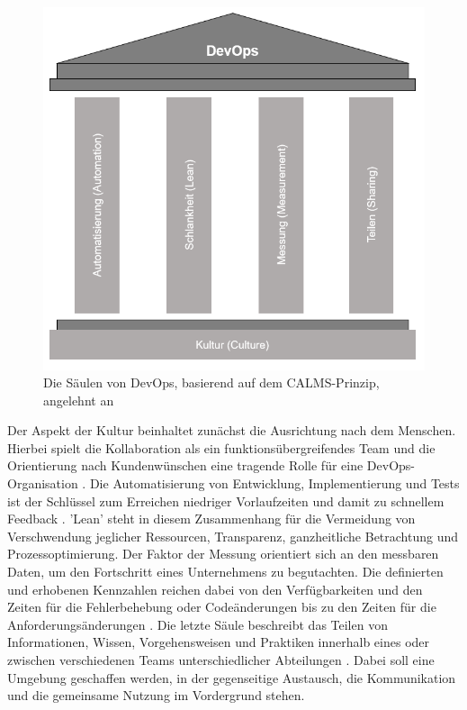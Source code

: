 \begin{figure}[h]
     \centering
     \includegraphics[scale=0.4]{Bilder/Calms.png}
     \caption{Die Säulen von DevOps, basierend auf dem CALMS-Prinzip, angelehnt an \cite{hornby_devops_2019}}
 \end{figure}

Der Aspekt der Kultur beinhaltet zunächst die Ausrichtung nach dem Menschen. Hierbei spielt die Kollaboration als ein funktionsübergreifendes Team und die Orientierung nach Kundenwünschen eine tragende Rolle für eine DevOps-Organisation \cite[S.5]{halstenberg_devops_2020}. Die Automatisierung von Entwicklung, Implementierung und Tests ist der Schlüssel zum Erreichen niedriger Vorlaufzeiten und damit zu schnellem Feedback \cite{humble_why_2011}. 'Lean' steht in diesem Zusammenhang für die Vermeidung von Verschwendung jeglicher Ressourcen, Transparenz, ganzheitliche Betrachtung und Prozessoptimierung. Der Faktor der Messung orientiert sich an den messbaren Daten, um den Fortschritt eines Unternehmens zu begutachten. Die definierten und erhobenen Kennzahlen reichen dabei von den Verfügbarkeiten und den Zeiten für die Fehlerbehebung oder Codeänderungen bis zu den Zeiten für die Anforderungsänderungen \cite[S. 7]{halstenberg_devops_2020}. Die letzte Säule beschreibt das Teilen von Informationen, Wissen, Vorgehensweisen und Praktiken innerhalb eines oder zwischen verschiedenen Teams unterschiedlicher Abteilungen \cite{halstenberg_devops_2020}. Dabei soll eine Umgebung geschaffen werden, in der gegenseitige Austausch, die Kommunikation und die gemeinsame Nutzung im Vordergrund stehen.\\\\

